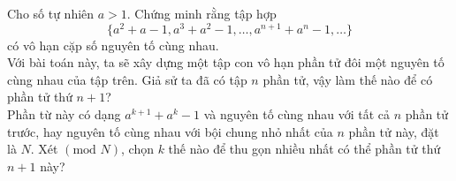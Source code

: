 \begin{bt}%
	Cho số tự nhiên $a>1$. Chứng minh rằng tập hợp 
	\[\{ a^2+a-1,a^3+a^2-1, \dots,a^{n+1}+a^n-1, \dots\}\]
	có vô hạn cặp số nguyên tố cùng nhau. \\
	Với bài toán này, ta sẽ xây dựng một tập con vô hạn phần tử đôi một nguyên tố cùng nhau của tập trên. Giả sử ta đã có tập $n$ phần tử, vậy làm thế nào để có phần tử thứ $n+1$? \\
	Phần từ này có dạng $a^{k+1}+a^k-1$ và nguyên tố cùng nhau với tất cả $n$ phần tử trước, hay nguyên tố cùng nhau với bội chung nhỏ nhất của $n$ phần tử này, đặt là $N$. Xét $(\textrm{mod }N)$, chọn $k$ thế nào để thu gọn nhiều nhất có thể phần tử thứ $n+1$ này?
\end{bt}

